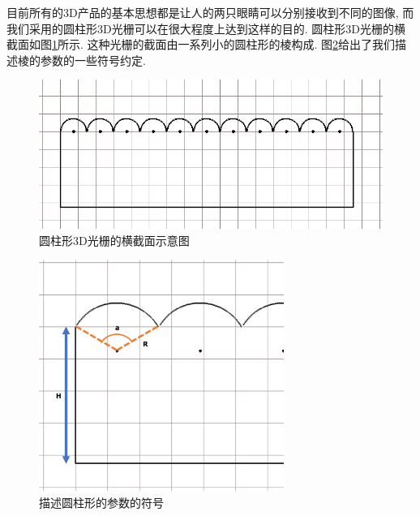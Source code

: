 \documentclass[a4paper, 11pt]{article}
\begin{document}
\begin{CJK}{UTF8}{gbsn}
目前所有的3D产品的基本思想都是让人的两只眼睛可以分别接收到不同的图像, 而我们采用的圆柱形3D光栅可以在很大程度上达到这样的目的. 圆柱形3D光栅的横截面如图\ref{fig:226}所示. 这种光栅的截面由一系列小的圆柱形的棱构成. 图\ref{fig:227}给出了我们描述棱的参数的一些符号约定.
\begin{figure}[h!]
  \centerline{\includegraphics[width=\linewidth]{226.png}}
  \caption{圆柱形3D光栅的横截面示意图}
  \label{fig:226}
\end{figure}
\begin{figure}[h!]
  \centerline{\includegraphics[width=8cm]{227.png}}
  \caption{描述圆柱形的参数的符号}
  \label{fig:227}
\end{figure}


\end{CJK}
\end{document}
